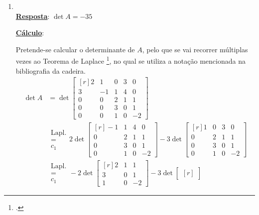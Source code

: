 \begin{enumerate}[label=\alph*.]
	\item \;\\
		\textbf{\underline{Resposta}}: $\det A = -35$

		\textbf{\underline{Cálculo}}:

		Pretende-se calcular o determinante de $A$, pelo que se vai recorrer
		múltiplas vezes ao Teorema de Laplace
		\footcite[pág. 129, Proposiçãp 3.9, Teorema de Laplace]{Cabral2012},
		no qual se utiliza a notação mencionada na bibliografia da cadeira.
		\begin{align*}
			\det A
			&=
			\det
			\begin{bmatrix*}[r]
				2 & 1 & 0 & 3 & 0\\
				3 & -1 & 1 & 4 & 0\\
				0 & 0 & 2 & 1 & 1\\
				0 & 0 & 3 & 0 & 1\\
				0 & 0 & 1 & 0 & -2
			\end{bmatrix*}\\
			&
			\begin{matrix}
				\text{Lapl.}\\
				=\\
				c_1
			\end{matrix}
			2
			\det
			\begin{bmatrix*}[r]
				-1 & 1 & 4 & 0\\
				0 & 2 & 1 & 1\\
				0 & 3 & 0 & 1\\
				0 & 1 & 0 & -2
			\end{bmatrix*}
			-
			3
			\det
			\begin{bmatrix*}[r]
				1 & 0 & 3 & 0\\
				0 & 2 & 1 & 1\\
				0 & 3 & 0 & 1\\
				0 & 1 & 0 & -2
			\end{bmatrix*}\\
			&
			\begin{matrix}
				\text{Lapl.}\\
				=\\
				c_1
			\end{matrix}
			-2
			\det
			\begin{bmatrix*}[r]
				2 & 1 & 1\\
				3 & 0 & 1\\
				1 & 0 & -2
			\end{bmatrix*}
			-
			3
			\det
			\begin{bmatrix*}[r]

\end{bmatrix*}
\end{align*}
\end{enumerate}

